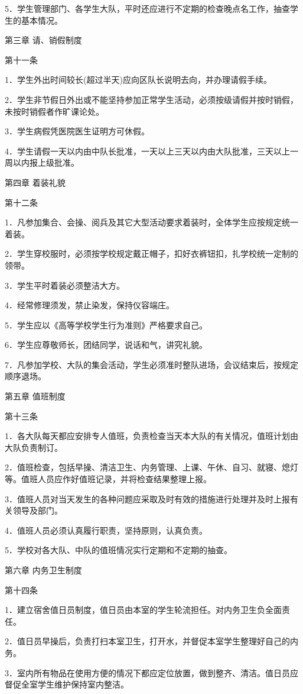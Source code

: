 \documentclass[UTF8,12pt,a4paper]{report}
\begin{document}
5．学生管理部门、各学生大队，平时还应进行不定期的检查晚点名工作，抽查学生的基本情况。

第三章 请、销假制度

第十一条

1．学生外出时间较长(超过半天)应向区队长说明去向，并办理请假手续。

2．学生非节假日外出或不能坚持参加正常学生活动，必须按级请假并按时销假，未按时销假者作旷课论处。

3．学生病假凭医院医生证明方可休假。

4．学生请假一天以内由中队长批准，一天以上三天以内由大队批准，三天以上一周以内报上级批准。

第四章 着装礼貌

第十二条

1．凡参加集合、会操、阅兵及其它大型活动要求着装时，全体学生应按规定统一着装。

2．学生穿校服时，必须按学校规定戴正帽子，扣好衣裤钮扣，扎学校统一定制的领带。

3．学生平时着装必须整洁大方。

4．经常修理须发，禁止染发，保持仪容端庄。

5．学生应以《高等学校学生行为准则》严格要求自己。

6．学生应尊敬师长，团结同学，说话和气，讲究礼貌。

7．凡参加学校、大队的集会活动，学生必须准时整队进场，会议结束后，按规定顺序退场。

第五章 值班制度

第十三条

1．各大队每天都应安排专人值班，负责检查当天本大队的有关情况，值班计划由大队负责制订。

2．值班检查，包括早操、清洁卫生、内务管理、上课、午休、自习、就寝、熄灯等。值班人员应作好值班记录，并将检查结果整理上报。

3．值班人员对当天发生的各种问题应采取及时有效的措施进行处理并及时上报有关领导及部门。

4．值班人员必须认真履行职责，坚持原则，认真负责。

5．学校对各大队、中队的值班情况实行定期和不定期的抽查。

第六章 内务卫生制度

第十四条

1．建立宿舍值日员制度，值日员由本室的学生轮流担任。对内务卫生负全面责任。

2．值日员早操后，负责打扫本室卫生，打开水，并督促本室学生整理好自己的内务。

3．室内所有物品在使用方便的情况下都应定位放置，做到整齐、清洁。值日员应督促全室学生维护保持室内整洁。
\end{document}
